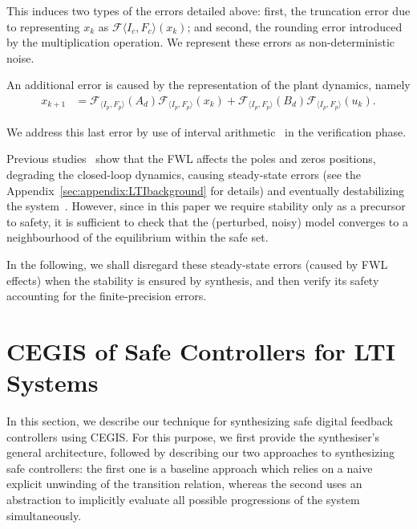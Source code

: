 \documentclass[runningheads,a4paper]{llncs}
\begin{document}
This induces two types of the errors detailed above:  
first, the truncation error due to representing $x_k$ as $\mathcal{F}{\langle I_c,F_c \rangle}(x_{k})$; 
and second, the rounding error introduced by the multiplication operation. 
We represent these errors as non-deterministic noise.

An additional error is caused by the representation of the plant dynamics, namely 
\begin{align*}
x_{k+1} &=\mathcal{F}_{\langle I_p,F_p \rangle}(A_d) \mathcal{F}_{\langle I_p,F_p \rangle}(x_{k}) + \mathcal{F}_{\langle I_p,F_p \rangle}(B_d)\mathcal{F}_{\langle I_p,F_p \rangle}(u_{k}).
\end{align*}

We address this last error by use of interval arithmetic~\cite{moore1966interval} in the verification phase.

Previous studies~\cite{gangli1} show that the FWL affects the poles and 
zeros positions, degrading the closed-loop dynamics, causing steady-state 
errors (see the Appendix~\ref{sec:appendix:LTIbackground} for details) 
and eventually destabilizing  the system~\cite{Bessa16}. However, since 
in this paper we require stability only as a precursor to safety, it is 
sufficient to check that the (perturbed, noisy) model converges to a neighbourhood of the equilibrium within the safe set.  

In the following, we shall disregard these steady-state errors (caused by FWL effects)
 when the stability is ensured by synthesis, and then verify its safety accounting for the finite-precision errors. 
\section{CEGIS of Safe Controllers for LTI Systems} 
\label{sec:CEGARIS} 

In this section, we describe our technique for synthesizing safe
digital feedback controllers using CEGIS.  For this purpose, we first
provide the synthesiser's general architecture, followed by describing
our two approaches to synthesizing safe controllers:
the first one is a baseline approach which relies on a naive explicit
unwinding of the transition relation, whereas the second uses an
abstraction to implicitly evaluate all possible progressions of the
system simultaneously. %
\end{document}
